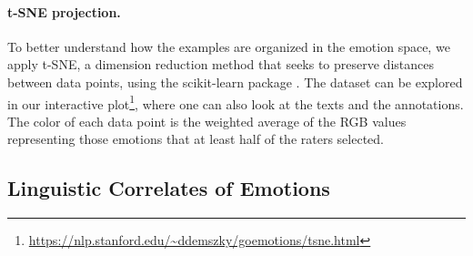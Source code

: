 \documentclass[11pt,a4paper]{article}
\begin{document}
\paragraph{t-SNE projection.} To better understand how the examples are organized in the emotion space, we apply t-SNE, a dimension reduction method that seeks to preserve distances between data points, using the scikit-learn package \citep{scikit-learn}. The dataset can be explored in our interactive plot\footnote{\url{https://nlp.stanford.edu/~ddemszky/goemotions/tsne.html}}, where one can also look at the texts and the annotations. The color of each data point is the weighted average of the RGB values representing those emotions that at least half of the raters selected.

\subsection{Linguistic Correlates of Emotions}
\end{document}
